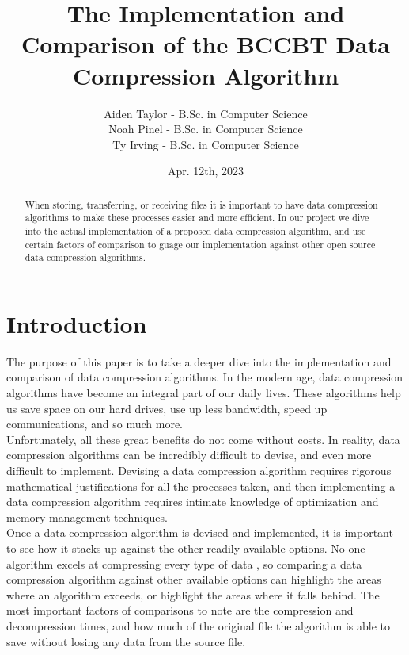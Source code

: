 \documentclass[12pt]{IEEEtran}
\newcommand{\Aiden}{Aiden Taylor - B.Sc. in Computer Science}
\newcommand{\Noah}{Noah Pinel - B.Sc. in Computer Science}
\newcommand{\Ty}{Ty Irving - B.Sc. in Computer Science}
\begin{document}
\title{The Implementation and Comparison of the BCCBT Data Compression Algorithm}
\author{
    \Aiden \\ \Noah\\ \Ty\\ 
}
\date{Apr. 12th, 2023}

\maketitle

\begin{abstract}
When storing, transferring, or receiving files it is important to have data compression algorithms to make
these processes easier and more efficient. In our project we dive into the actual implementation
of a proposed data compression algorithm, and use certain factors of comparison to guage our implementation
against other open source data compression algorithms.
\end{abstract}

\section{Introduction}
The purpose of this paper is to take a deeper dive into the implementation and comparison of data compression
algorithms. In the modern age, data compression algorithms have become an integral part of our daily lives.
These algorithms help us save space on our hard drives, use up less bandwidth,
speed up communications, and so much more. \\

Unfortunately, all these great benefits do
not come without costs. In reality, data compression algorithms can be incredibly difficult to devise, and even
more difficult to implement. 
Devising a data compression algorithm requires rigorous mathematical justifications for all the processes taken, and
then implementing a data compression algorithm requires intimate knowledge of optimization and memory management
techniques. \\

Once a data compression algorithm is devised and implemented, it is important to see how it
stacks up against the other readily available options. No one algorithm excels at compressing every
type of data \cite{Sjostrand}, so comparing a data compression algorithm against other available options
can highlight the areas where an algorithm exceeds, or highlight the areas where it falls behind. The most important factors 
of comparisons to note are the compression and decompression times, and how much of the original file
the algorithm is able to save without losing any data from the source file.\\
\end{document}
